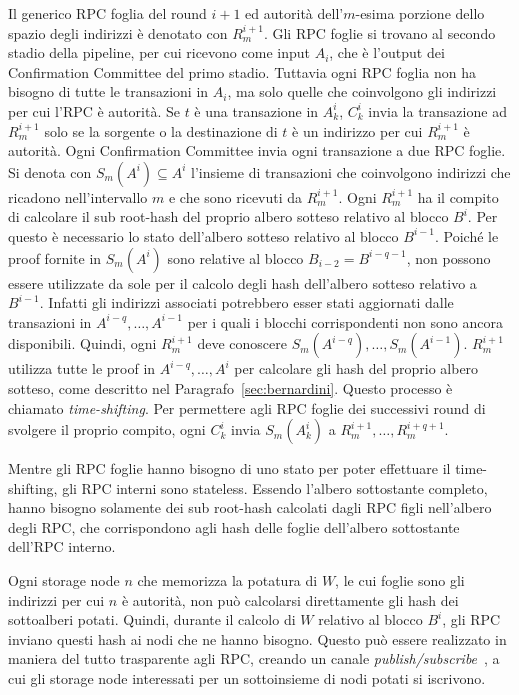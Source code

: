 Il generico RPC foglia del round $i+1$ ed autorità dell'$m$-esima porzione dello spazio degli indirizzi è denotato con $R_m^{i+1}$. Gli RPC foglie si trovano al secondo stadio della pipeline, per cui ricevono come input $A_i$, che è l'output dei Confirmation Committee del primo stadio. Tuttavia ogni RPC foglia non ha bisogno di tutte le transazioni in $A_i$, ma solo quelle che coinvolgono gli indirizzi per cui l'RPC è autorità. Se $t$ è una transazione in $A_k^i$, $C_k^i$ invia la transazione ad $R_m^{i+1}$ solo se la sorgente o la destinazione di $t$ è un indirizzo per cui $R_m^{i+1}$ è autorità. Ogni Confirmation Committee invia ogni transazione a due RPC foglie. Si denota con $S_m(A^i) \subseteq A^i$ l'insieme di transazioni che coinvolgono indirizzi che ricadono nell'intervallo $m$ e che sono ricevuti da $R_m^{i+1}$. Ogni $R_m^{i+1}$ ha il compito di calcolare il sub root-hash del proprio albero sotteso relativo al blocco $B^i$. Per questo è necessario lo stato dell'albero sotteso relativo al blocco $B^{i-1}$. Poiché le proof fornite in $S_m(A^i)$ sono relative al blocco $B_{i-2} = B^{i-q-1}$, non possono essere utilizzate da sole per il calcolo degli hash dell'albero sotteso relativo a $B^{i-1}$. Infatti gli indirizzi associati potrebbero esser stati aggiornati dalle transazioni in $A^{i-q}, \dots, A^{i-1}$ per i quali i blocchi corrispondenti non sono ancora disponibili. Quindi, ogni $R_m^{i+1}$ deve conoscere $S_m(A^{i-q}), \dots, S_m(A^{i-1})$. $R_m^{i+1}$ utilizza tutte le proof in $A^{i-q}, \dots, A^{i}$ per calcolare gli hash del proprio albero sotteso, come descritto nel Paragrafo~\ref{sec:bernardini}. Questo processo è chiamato \emph{time-shifting}. Per permettere agli RPC foglie dei successivi round di svolgere il proprio compito, ogni $C_k^i$ invia $S_m(A_k^i)$ a $R_m^{i+1}, \dots, R_m^{i+q+1}$.

Mentre gli RPC foglie hanno bisogno di uno stato per poter effettuare il time-shifting, gli RPC interni sono stateless. Essendo l'albero sottostante completo, hanno bisogno solamente dei sub root-hash calcolati dagli RPC figli nell'albero degli RPC, che corrispondono agli hash delle foglie dell'albero sottostante dell'RPC interno.

Ogni storage node $n$ che memorizza la potatura di $W$, le cui foglie sono gli indirizzi per cui $n$ è autorità, non può calcolarsi direttamente gli hash dei sottoalberi potati. Quindi, durante il calcolo di $W$ relativo al blocco $B^i$, gli RPC inviano questi hash ai nodi che ne hanno bisogno. Questo può essere realizzato in maniera del tutto trasparente agli RPC, creando un canale \textit{publish/subscribe}~\cite{eugster2003many}, a cui gli storage node interessati per un sottoinsieme di nodi potati si iscrivono.


